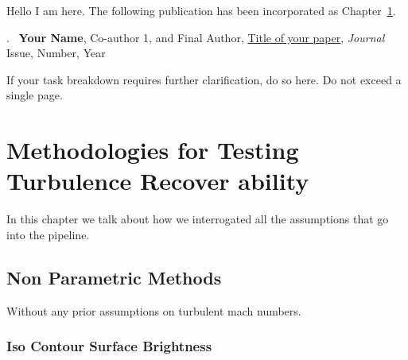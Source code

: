 \cleartoevenpage
\pagestyle{empty}	

\noindent
Hello I am here. The following publication has been incorporated as Chapter~\ref{Chap:assumptionsInterrogationsMethod}.

.~\cite{DumyCitationKey} \textbf{Your Name}, Co-author 1, and Final Author, \href{linktoyourpaper}{Title of your paper}, \textit{Journal} Issue, Number, Year

If your task breakdown requires further clarification, do so here. Do not exceed a single page.


\chapter[Abbreviated title]{Methodologies for Testing Turbulence Recover ability}\label{Chap:assumptionsInterrogationsMethod}	%
\pagestyle{headings}

In this chapter we talk about how we interrogated all the assumptions that go into the pipeline.



\section{Non Parametric Methods}\label{Chap:interrogationsNPMethods}	%

Without any prior assumptions on turbulent mach numbers.
\subsection{Iso Contour Surface Brightness}\label{Chap:interrogationsIsocontourBrightness}

